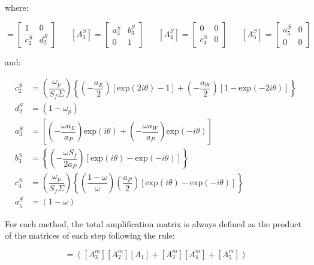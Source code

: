 \documentclass[final,3p,times,11pt,onecolumn]{myElsarticle}
\numberwithin{equation}{section}
\begin{document}
\noindent where:

\begin{equation}
[A^S_2]= 
\begin{bmatrix}
1 & 0 \\
c^S_2 & d^S_2
\end{bmatrix}
\; \; \; \; \; \;
[A^S_3]= 
\begin{bmatrix}
a^S_3 & b^S_3 \\
0 & 1
\end{bmatrix}
\; \; \; \; \; \;
[A^S_4]= 
\begin{bmatrix}
0 & 0 \\
c^S_4 & 0
\end{bmatrix}
\; \; \; \; \; \;
[A^S_5]= 
\begin{bmatrix}
a^S_5 & 0 \\
0 & 0
\end{bmatrix}
\end{equation}

\noindent and:

\begin{equation}
\begin{split}
     c^S_2 &= \left( \dfrac{\omega_p}{S_f \Sigma} \right) 
                    \left\{ \left(-\dfrac{a_E}{2} \right) \left[\text{exp} (2 i \theta) - 1 \right] +
                            \left(-\dfrac{a_W}{2} \right) \left[1 - \text{exp} (-2 i \theta)\right]
                    \right\} \\
     d^S_2 &= (1-\omega_p) \\
     a^S_3 &= \left[\left(-\dfrac{\omega a_E}{a_P}\right) \text{exp} (i \theta) + \left(- \dfrac{\omega a_W}{a_P}\right) \text{exp} (- i \theta)\right] \\
     b^S_3 &= \left\{\left(-\dfrac{\omega S_f}{2 a_P}\right) \left[\text{exp} (i \theta)-\text{exp} (-i \theta)\right] \right\} \\ 
     c^S_4 &= \left( \dfrac{\omega_p}{S_f \Sigma} \right) 
                    \left\{ \left(\dfrac{1-\omega}{\omega} \right) \left(\dfrac{a_P}{2} \right) \left[\text{exp} (i \theta) - \text{exp} (- i \theta) \right] 
                    \right\} \\
     a^S_5 &= (1-\omega)      
\end{split}
\end{equation}

For each method, the total amplification matrix is always defined as the product of the matrices of each step following the rule:

\begin{equation}
[A^m] = ([A^m_3] [A^m_2] [A_1] + [A^m_3] [A^m_4] + [A^m_5])
\end{equation}
\end{document}
